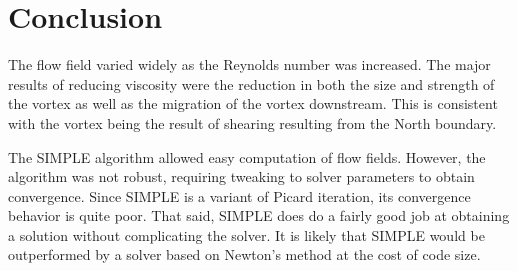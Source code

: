\documentclass[12pt,twocolumn]{article}
\begin{document}
\section*{Conclusion}
The flow field varied widely as the Reynolds number was increased.
The major results of reducing viscosity were the reduction in both the size and strength of the vortex as well as the migration of the vortex downstream.
This is consistent with the vortex being the result of shearing resulting from the North boundary.

The SIMPLE algorithm allowed easy computation of flow fields.
However, the algorithm was not robust, requiring tweaking to solver parameters to obtain convergence.
Since SIMPLE is a variant of Picard iteration, its convergence behavior is quite poor.
That said, SIMPLE does do a fairly good job at obtaining a solution without complicating the solver.
It is likely that SIMPLE would be outperformed by a solver based on Newton's method at the cost of code size.
\end{document}
